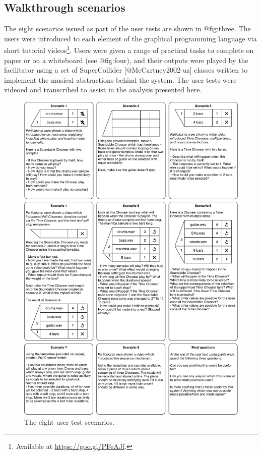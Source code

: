 \documentclass[]{article}
\begin{document}
\hypertarget{walkthrough-scenarios}{%
\subsection{Walkthrough scenarios}\label{walkthrough-scenarios}}

The eight scenarios issued as part of the user tests are shown in
@fig:three. The users were introduced to each element of the graphical
programming language via short tutorial videos\footnote{Available at
  \url{https://goo.gl/PFeAJf}.}. Users were given a range of practical
tasks to complete on paper or on a whiteboard (see @fig:four), and their
outputs were played by the facilitator using a set of SuperCollider
{[}@McCartney2002-uz{]} classes written to implement the musical
abstractions behind the system. The user tests were videoed and
transcribed to assist in the analysis presented here.

\begin{figure}
\hypertarget{fig:three}{%
\centering
\includegraphics{./media/image3.png}
\caption{The eight user test scenarios.}\label{fig:three}
}
\end{figure}
\end{document}
